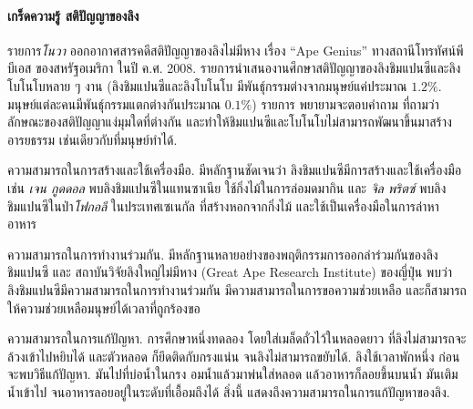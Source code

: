 {\small
	\begin{shaded}
		\paragraph{\small เกร็ดความรู้ สติปัญญาของลิง}
		
		
		รายการ\textit{โนวา} ออกอากาศสารคดีสติปัญญาของลิงไม่มีหาง
		เรื่อง ``Ape Genius''
		ทางสถานีโทรทัศน์พีบีเอส ของสหรัฐอเมริกา ในปี ค.ศ. 2008.
		รายการนำเสนองานศึกษาสติปัญญาของลิงชิมแปนซีและลิงโบโนโบหลาย ๆ งาน (ลิงชิมแปนซีและลิงโบโนโบ มีพันธุ์กรรมต่างจากมนุษย์แค่ประมาณ $1.2\%$.
		มนุษย์แต่ละคนมีพันธุ์กรรมแตกต่างกันประมาณ $0.1\%$)
		รายการ พยายามจะตอบคำถาม ที่ถามว่า ลักษณะของสติปัญญาแง่มุมใดที่ต่างกัน และทำให้ชิมแปนซีและโบโนโบไม่สามารถพัฒนาขึ้นมาสร้างอารยธรรม เช่นเดียวกับที่มนุษย์ทำได้.
		
		ความสามารถในการสร้างและใช้เครื่องมือ.
		มีหลักฐานชัดเจนว่า ลิงชิมแปนซีมีการสร้างและใช้เครื่องมือ เช่น \textit{เจน กูดดอล} พบลิงชิมแปนซีในแทนซาเนีย ใช้กิ่งไม้ในการล่อมดมากิน
		และ
		\textit{จิล พริตซ์} พบลิงชิมแปนซีในป่า\textit{โฟกอลี} ในประเทศเซเนกัล ที่สร้างหอกจากกิ่งไม้ และใช้เป็นเครื่องมือในการล่าหาอาหาร
		
		ความสามารถในการทำงานร่วมกัน.
		มีหลักฐานหลายอย่างของพฤติกรรมการออกล่าร่วมกันของลิงชิมแปนซี
		และ สถาบันวิจัยลิงใหญ่ไม่มีหาง (Great Ape Research Institute) ของญี่ปุ่น
		พบว่า ลิงชิมแปนซีมีความสามารถในการทำงานร่วมกัน มีความสามารถในการขอความช่วยเหลือ และก็สามารถให้ความช่วยเหลือมนุษย์ได้เวลาที่ถูกร้องขอ
		
		ความสามารถในการแก้ปัญหา.
		การศึกษาหนึ่งทดลอง โดยใส่เมล็ดถั่วไว้ในหลอดยาว ที่ลิงไม่สามารถจะล้วงเข้าไปหยิบได้
		และตัวหลอด ก็ยึดติดกับกรงแน่น จนลิงไม่สามารถขยับได้.
		ลิงใช้เวลาพักหนึ่ง ก่อนจะพบวิธีแก้ปัญหา.
		มันไปที่บ่อน้ำในกรง อมน้ำแล้วมาพ่นใส่หลอด แล้วอาหารก็ลอยขึ้นบนน้ำ 
		มันเติมน้ำเข้าไป จนอาหารลอยอยู่ในระดับที่เอื้อมถึงได้
		สิ่งนี้ แสดงถึงความสามารถในการแก้ปัญหาของลิง.
		

\end{shaded}}
